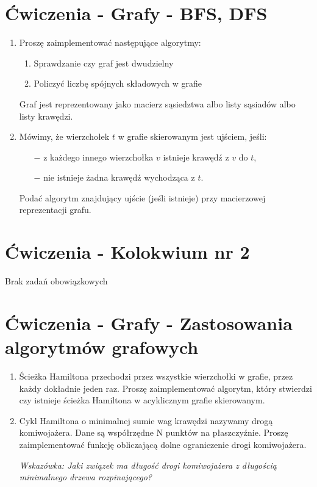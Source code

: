 \documentclass[11pt]{article}
\begin{document}
\section{Ćwiczenia - Grafy - BFS, DFS}
\begin{enumerate}
		
	\item Proszę zaimplementować następujące algorytmy:
	\begin{enumerate}
		\item Sprawdzanie czy graf jest dwudzielny
		\item Policzyć liczbę spójnych składowych w grafie
	\end{enumerate}
	Graf jest reprezentowany jako macierz sąsiedztwa albo listy sąsiadów albo listy krawędzi.
	
	\item Mówimy, że wierzchołek $t$ w grafie skierowanym jest ujściem, jeśli:	
	\begin{itemize}
		\item[$-$] z każdego innego wierzchołka $v$ istnieje krawędź z $v$ do $t$,
		\item[$-$] nie istnieje żadna krawędź wychodząca z $t$.
	\end{itemize}
	Podać algorytm znajdujący ujście (jeśli istnieje) przy macierzowej reprezentacji grafu.
	\end{enumerate}
\section{Ćwiczenia - Kolokwium nr 2}
	Brak zadań obowiązkowych
\section{Ćwiczenia - Grafy - Zastosowania algorytmów grafowych}

\begin{enumerate}
	
	\item Ścieżka Hamiltona przechodzi przez wszystkie wierzchołki w grafie, przez każdy dokładnie jeden raz. Proszę zaimplementować algorytm, który stwierdzi czy istnieje ścieżka Hamiltona w acyklicznym grafie skierowanym.
	\item Cykl Hamiltona o minimalnej sumie wag krawędzi nazywamy drogą komiwojażera. Dane są współrzędne N punktów na płaszczyźnie. Proszę zaimplementować funkcję	obliczającą dolne ograniczenie drogi komiwojażera.
	
		
{\small \textit{	Wskazówka: Jaki związek ma długość drogi komiwojażera z długością minimalnego drzewa rozpinającego?}}
\end{enumerate}
	
\end{document}
